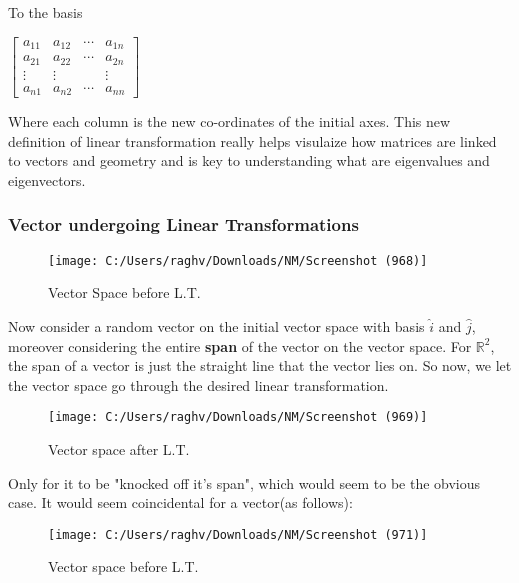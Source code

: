 \documentclass{article}
\begin{document}
To the basis

\begin{center}

    \begin{math}
        \begin{bmatrix}
            a_{11} & a_{12} & \cdots & a_{1n} \\ 
            a_{21} & a_{22} & \cdots & a_{2n} \\
            \vdots & \vdots & & \vdots \\
            a_{n1} & a_{n2} & \cdots & a_{nn} 
        \end{bmatrix}
    \end{math}

\end{center}

Where each column is the new co-ordinates of the initial axes. This new definition of linear transformation really helps visulaize how matrices are linked to vectors and geometry and is key to understanding what are eigenvalues and eigenvectors.

\subsubsection{Vector undergoing Linear Transformations}

\begin{figure}[h]
    \centering
    \texttt{[image: C:/Users/raghv/Downloads/NM/Screenshot (968)]}
    \caption{Vector Space before L.T.}
    \label{fig:image1}
  \end{figure}

    Now consider a random vector on the initial vector space with basis $\hat{i}$ and $\hat{j}$, moreover considering the entire \large \textbf{span} \normalsize of the vector on the vector space. For $ \mathbb{R}^ 2 $, the span of a vector is just the straight line that the vector lies on. So now, we let the vector space go through the desired linear transformation.
  
  \begin{figure}[h]
    \centering
    \texttt{[image: C:/Users/raghv/Downloads/NM/Screenshot (969)]}
    \caption{Vector space after L.T.}
    \label{fig:image2}
\end{figure}

Only for it to be "knocked off it's span", which would seem to be the obvious case. It would seem coincidental for a vector(as follows):
\begin{figure}[h]
    \centering
    \texttt{[image: C:/Users/raghv/Downloads/NM/Screenshot (971)]}
    \caption{Vector space before L.T.}
    \label{fig:image2}
\end{figure}
\end{document}
